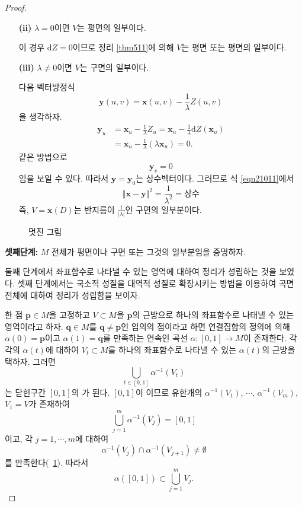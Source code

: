 \begin{proof}
\begin{itemize}
\item[\textbf{(ii)}] $\lambda  = 0$이면 $V$는 평면의 일부이다.

이 경우 $\mathrm{d}Z = 0$이므로 정리 \ref{thm511}에 의해 $V$는 평면 또는 평면의
일부이다.

\item[\textbf{(iii)}] $\lambda \ne 0$이면 $V$는 구면의 일부이다.

다음 벡터방정식
\begin{equation}
\mathbf{y}(u, v) = \mathbf{x}(u, v) - \frac{1}{\lambda} Z(u, v)\label{eqn21011}
\end{equation}
을 생각하자.
\begin{align}
\mathbf{y}_u &= \mathbf{x}_u - \frac{1}{\lambda} Z_u
= \mathbf{x}_u - \frac{1}{\lambda} \mathrm{d}Z(\mathbf{x}_u)\\
&= \mathbf{x}_u - \frac{1}{\lambda}\left(\lambda \mathbf{x}_u \right) =0.
\end{align}
같은 방법으로
\[
\mathbf{y}_v = 0
\]
임을 보일 수 있다. 따라서 $\mathbf{y} = \mathbf{y}_0$는 상수벡터이다.
그러므로 식 \eqref{eqn21011}에서
\[
\Vert  \mathbf{x} - \mathbf{y}\Vert^2 = \frac{1}{\lambda^2} = \text{상수}
\]
즉, $V = \mathbf{x}(D)$는 반지름이 $\displaystyle{\frac{1}{|\lambda|}}$인
구면의 일부분이다.
\end{itemize}


\begin{figure}
\centering{%
\texttt{[image: 5-01]}
}
\caption{멋진 그림}\label{fig:wonderful_figure}
\end{figure}


\textbf{셋째단계:} $M$ 전체가 평면이나 구면 또는 그것의 일부분임을 증명하자.

둘째 단계에서 좌표함수로 나타낼 수 있는 영역에 대하여 정리가 성립하는 것을
보였다. 셋째 단계에서는 국소적 성질을 대역적 성질로 확장시키는 방법을 이용하여
곡면 전체에 대하여 정리가 성립함을 보이자.

한 점 $\mathbf{p}\in M$을 고정하고 $V\subset M$을
$\mathbf{p}$의 근방으로 하나의 좌표함수로 나태낼 수 있는 영역이라고 하자.
$\mathbf{q}\in M$를 $\mathbf{q}\ne \mathbf{p}$인 임의의 점이라고 하면
연결집합의 정의에 의해
$\alpha(0) = \mathbf{p}$이고 $\alpha(1) = \mathbf{q}$를 만족하는
연속인 곡선 $\alpha : [0,1] \to M$이 존재한다. 각각의 $\alpha(t)$에 대하여
$V_t \subset M$를 하나의 좌표함수로 나타낼 수 있는 $\alpha(t)$의 근방을 택하자.
그러면
\[
\bigcup_{t \in [0,1]}\alpha^{-1}(V_t)
\]
는 닫힌구간 $[0,1]$의 가 된다. $[0,1]$이 이므로
유한개의  $\alpha^{-1}(V_1)$, $\cdots$, $\alpha^{-1}(V_m)$, $V_1 = V$가 존재하여
\[
\bigcup_{j= 1}^m\alpha^{-1}(V_j) = [0,1]
\]
이고, 각 $j=1, \cdots, m$에 대하여
\begin{equation}
\alpha^{-1}(V_j) \cap \alpha^{-1}(V_{j+1})\ne \emptyset\label{eqn21012}
\end{equation}
를 만족한다(\figurename~\ref{fig:wonderful_figure}). 따라서
\[
\alpha([0,1]) \subset \bigcup_{j=1}^m V_j.
\]


\end{proof}
